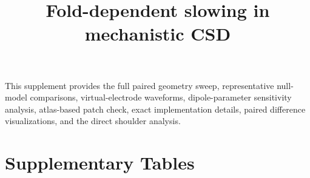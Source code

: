 \documentclass[12pt]{article}
\title{Fold-dependent slowing in mechanistic CSD}
\author{}
\date{}
\begin{document}
\maketitle

\renewcommand{\thetable}{S\arabic{table}}
\renewcommand{\thefigure}{S\arabic{figure}}

This supplement provides the full paired geometry sweep, representative null-model comparisons, virtual-electrode waveforms, dipole-parameter sensitivity analysis, atlas-based patch check, exact implementation details, paired difference visualizations, and the direct shoulder analysis.

\section*{Supplementary Tables}
\end{document}
